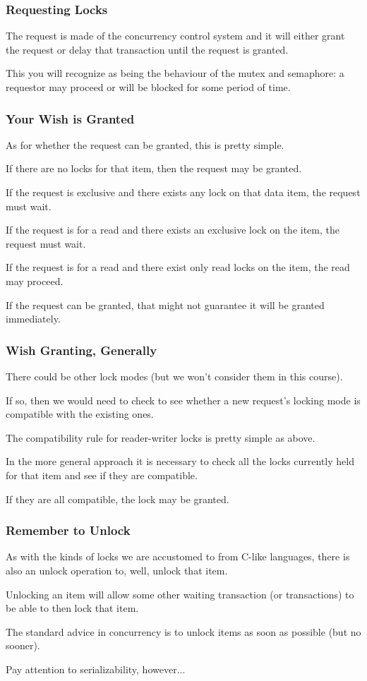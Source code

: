 \begin{frame}
\frametitle{Requesting Locks}

 The request is made of the concurrency control system and it will either grant the request or delay that transaction until the request is granted.
 
 This you will recognize as being the behaviour of the mutex and semaphore: a requestor may proceed or will be blocked for some period of time.

\end{frame}

\begin{frame}
\frametitle{Your Wish is Granted}

As for whether the request can be granted, this is pretty simple. 

If there are no locks for that item, then the request may be granted. 

If the request is exclusive and there exists any lock on that data item, the request must wait. 

If the request is for a read and there exists an exclusive lock on the item, the request must wait. 

If the request is for a read and there exist only read locks on the item, the read may proceed. 

If the request can be granted, that might not guarantee it will be granted immediately.


\end{frame}

\begin{frame}
\frametitle{Wish Granting, Generally}

There could be other lock modes (but we won't consider them in this course).

If so, then we would need to check to see whether a new request's locking mode is compatible with the existing ones. 

The compatibility rule for reader-writer locks is pretty simple as above. 

In the more general approach it is necessary to check all the locks currently held for that item and see if they are compatible. 

If they are all compatible, the lock may be granted.


\end{frame}

\begin{frame}
\frametitle{Remember to Unlock}

As with the kinds of locks we are accustomed to from C-like languages, there is also an unlock operation to, well, unlock that item. 

Unlocking an item will allow some other waiting transaction (or transactions) to be able to then lock that item.

The standard advice in concurrency is to unlock items as soon as possible (but no sooner).

Pay attention to serializability, however...

\end{frame}


